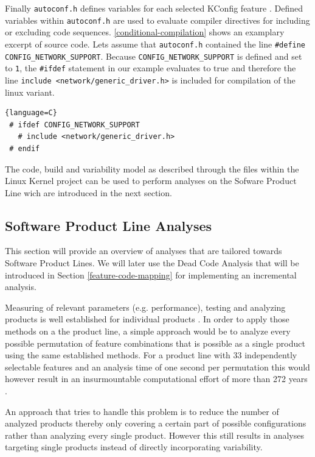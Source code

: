 \documentclass[a4paper]{article}
\begin{document}
Finally \texttt{autoconf.h} defines variables for each selected KConfig feature \cite{Tartler:2011:FCC:1966445.1966451}. Defined variables within \texttt{autoconf.h} are used to evaluate compiler directives for including or excluding code sequences. \autoref{conditional-compilation} shows an examplary excerpt of source code. Lets assume that \texttt{autoconf.h} contained the line \texttt{\#define CONFIG\_NETWORK\_SUPPORT}. Because \texttt{CONFIG\_NETWORK\_SUPPORT} is defined and set to \texttt{1}, the \texttt{\#ifdef} statement in our example evaluates to true and therefore the line \texttt{include <network/generic\_driver.h>} is included for compilation of the  linux variant.

\begin{lstlisting}[caption=Conditional Compilation within the Linux Kernel, label=conditional-compilation]{language=C}
 # ifdef CONFIG_NETWORK_SUPPORT
   # include <network/generic_driver.h>
 # endif
\end{lstlisting}

The code, build and variability model as described through the files within the Linux Kernel project can be used to perform analyses on the Sofware Product Line wich are introduced in the next section.

\newpage

\subsection{Software Product Line Analyses}

This section will provide an overview of analyses that are tailored towards Software Product Lines. We will later use the Dead Code Analysis that will be introduced in Section \ref{feature-code-mapping}  for implementing an incremental analysis.

Measuring of relevant parameters (e.g. performance), testing and analyzing products is well established for individual products \cite[p.243]{Apel:2013:FSP:2541773}. 
In order to apply those methods on a the product line, a simple approach would be to analyze every possible permutation of feature combinations that is possible as a single product using the same established methods. For a product line with 33 independently selectable features and an analysis time of one second per permutation this would however result in an insurmountable computational effort of more than 272 years \cite{Thum:2014:CSA:2620784.2580950}. 

An approach that tries to handle this problem is to reduce the number of analyzed products thereby only covering a certain part of possible configurations rather than analyzing every single product. However this still results in analyses targeting single products instead of directly incorporating variability.
\end{document}
